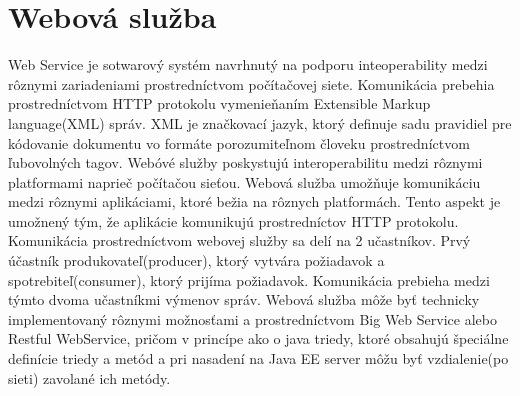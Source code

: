 \section{Webová služba}
Web Service je sotwarový systém navrhnutý na podporu inteoperability medzi rôznymi zariadeniami prostredníctvom počítačovej siete. Komunikácia prebehia prostredníctvom HTTP protokolu vymenieňaním Extensible Markup language(XML) správ. XML je značkovací jazyk, ktorý definuje sadu pravidiel pre kódovanie dokumentu vo formáte porozumiteľnom človeku prostredníctvom ľubovolných tagov. Webóvé služby poskystujú interoperabilitu medzi rôznymi platformami naprieč počítačou sieťou. Webová služba umožňuje komunikáciu medzi rôznymi aplikáciami, ktoré bežia na rôznych platformách. Tento aspekt je umožnený tým, že aplikácie komunikujú prostredníctov HTTP protokolu. Komunikácia prostredníctvom webovej služby sa delí na 2 učastníkov. Prvý účastník produkovateľ(producer), ktorý vytvára požiadavok a spotrebiteľ(consumer), ktorý prijíma požiadavok. Komunikácia prebieha medzi týmto dvoma učastníkmi výmenov správ. Webová služba môže byť technicky implementovaný rôznymi možnosťami a prostredníctvom Big Web Service alebo Restful WebService, pričom v princípe ako o java triedy, ktoré obsahujú špeciálne definície triedy a metód a pri nasadení na Java EE server môžu byť vzdialenie(po sieti) zavolané ich metódy. 



